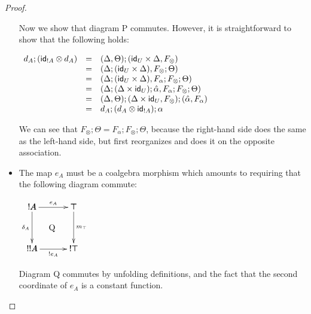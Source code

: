 \begin{proof}
\begin{report}
\begin{itemize}
    Now we show that diagram P commutes. However, it is
    straightforward to show that the following holds:
    \begin{center}
      \begin{math}
        \begin{array}{lll}
          d_A;(\mathsf{id}_{!A} \otimes d_A)
          & = & (\Delta,\Theta);(\mathsf{id}_U \times \Delta,F_\otimes)\\
          & = & (\Delta;(\mathsf{id}_U \times \Delta),F_\otimes;\Theta)\\
          & = & (\Delta;(\mathsf{id}_U \times \Delta),F_\alpha;F_\otimes;\Theta)\\
          & = & (\Delta;(\Delta \times \mathsf{id}_U);\hat{\alpha},F_\alpha;F_\otimes;\Theta)\\
          & = & (\Delta,\Theta);(\Delta \times \mathsf{id}_U,F_\otimes);(\hat{\alpha},F_\alpha)\\
          & = & d_A;(d_A \otimes \mathsf{id}_{!A});\alpha\\
        \end{array}
      \end{math}
    \end{center}
    We can see that $F_\otimes;\Theta = F_\alpha;F_\otimes;\Theta$,
    because the right-hand side does the same as the left-hand side,
    but first reorganizes and does it on the opposite association.

  \item The map $e_A$ must be a coalgebra morphism which amounts to
    requiring that the following diagram commute:
    \begin{center}
      \begin{math}
        \bfig
        \square/->`->`->`->/[!A`\top`!!A`!\top;e_A`\delta_A`m_\top`!e_A]
        \place(240,250)[\text{Q}]        
        \efig
      \end{math}
    \end{center}
    Diagram Q commutes by unfolding definitions, and the fact that the
    second coordinate of $e_A$ is a constant function.


\end{itemize}
\end{report}
\end{proof}
